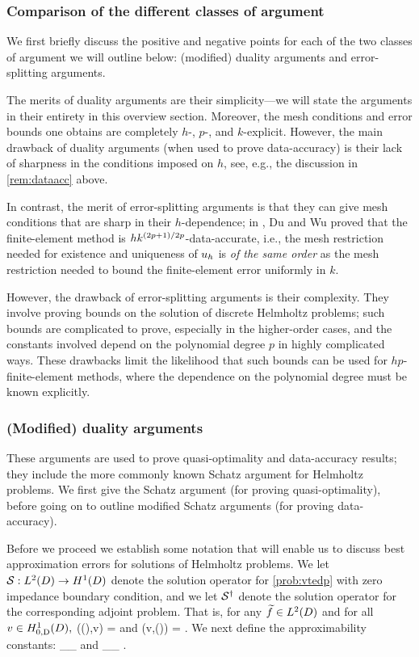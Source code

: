 \subsubsection{Comparison of the different classes of argument}
We first briefly discuss the positive and negative points for each of the two classes of argument we will outline below: (modified) duality arguments and error-splitting arguments.

The merits of duality arguments are their simplicity---we will state the arguments in their entirety in this overview section. Moreover, the mesh conditions and error bounds one obtains are completely $h$-, $p$-, and $k$-explicit. However, the main drawback of duality arguments (when used to prove data-accuracy) is their lack of sharpness in the conditions imposed on $h$, see, e.g., the discussion in \cref{rem:dataacc} above.

In contrast, the merit of error-splitting arguments is that they can give mesh conditions that are sharp in their $h$-dependence; in \cite{DuWu:15}, Du and Wu proved that the finite-element method is $hk^{(2p+1)/2p}$-data-accurate, i.e., the mesh restriction needed for existence and uniqueness of $u_{h}$ is \emph{of the same order} as the mesh restriction needed to bound the finite-element error uniformly in $k.$

However, the drawback of error-splitting arguments is their complexity. They involve proving bounds on the solution of discrete Helmholtz problems; such bounds are complicated to prove, especially in the higher-order cases, and the constants involved depend on the polynomial degree $p$ in highly complicated ways. These drawbacks limit the likelihood that such bounds can be used for $hp$-finite-element methods, where the dependence on the polynomial degree must be known explicitly.


\subsubsection{(Modified) duality arguments}
These arguments are used to prove quasi-optimality and data-accuracy results; they include the more commonly known Schatz argument for Helmholtz problems. We first give the Schatz argument (for proving quasi-optimality), before going on to outline modified Schatz arguments (for proving data-accuracy).

Before we proceed we establish some notation that will enable us to discuss best approximation errors for solutions of Helmholtz problems. We let $\solfem:\LtD\rightarrow \HoD$ denote the solution operator for \cref{prob:vtedp} with zero impedance boundary condition, and we let $\mathcal S^{\dagger}$ denote the solution operator for the corresponding adjoint problem. That is, for any $\ftilde \in \LtD$ and for all $v \in \HozDD,$
\beqs
\aT(\solfem(\ftilde),v) = 
\eeqs
and
\beqs
\aT(v,\solfems(\ftilde)) = .
\eeqs
We next define the approximability constants:
\beq\label{eq:wbadef}
\wba \de \sup_{\ftilde \in \LtD}\inf_{\vh \in \Vhp} \frac{\NHokD{\solfem(\ftilde) - \vh}}{\NLtD{\ftilde}}
\eeq
and
\beqs
\wbaadj \de \sup_{\ftilde \in \LtD}\inf_{\vh \in \Vhp} \frac{\NHokD{\solfems(\ftilde) - \vh}}{\NLtD{\ftilde}}.
\eeqs

